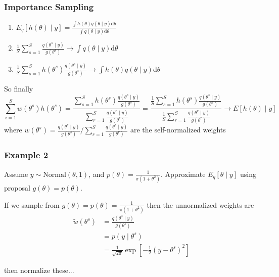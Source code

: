\documentclass{beamer}
\begin{document}
\begin{frame}[fragile]
\frametitle{Importance Sampling}

\begin{enumerate}
\item $E_q[h(\theta) \mid y] = \frac{\int h(\theta) q(\theta \mid y) \text{d}\theta }{\int q(\theta \mid y) \text{d}\theta } $
\item $\frac{1}{S}\sum_{s=1}^S \frac{q(\theta^s \mid y)}{g(\theta^s)} \to \int q(\theta \mid y) \text{d}\theta$ 
\item $\frac{1}{S}\sum_{s=1}^S h(\theta^s) \frac{q(\theta^s \mid y)}{g(\theta^s)} \to \int h(\theta)q(\theta \mid y) \text{d}\theta$
\end{enumerate}

So finally
\[
\sum_{i=1}^S w(\theta^s) h(\theta^s)
=
\frac{
\sum_{s=1}^S h(\theta^s) \frac{q(\theta^s \mid y)}{g(\theta^s)}}{
\sum_{r=1}^S \frac{q(\theta^{r} \mid y)}{g(\theta^{r})}  
}
=
\frac{
\frac{1}{S}\sum_{s=1}^S h(\theta^s) \frac{q(\theta^s \mid y)}{g(\theta^s)}}{
\frac{1}{S}\sum_{r=1}^S \frac{q(\theta^{r} \mid y)}{g(\theta^{r})}  
}
\to E[h(\theta) \mid y]
\]
where $w(\theta^s) = \frac{q(\theta^s \mid y)}{g(\theta^s)} \bigg/ \sum_{r=1}^S \frac{q(\theta^{r} \mid y)}{g(\theta^{r})}  $ are the self-normalized weights

\end{frame}


\begin{frame}[fragile]
\frametitle{Example 2}

Assume $y \sim \text{Normal}(\theta,1)$, and $p(\theta) = \frac{1}{\pi(1+\theta^2)}$. Approximate $E_q[\theta \mid y]$ using proposal $g(\theta) = p(\theta)$.
\newline
\pause

If we sample from $g(\theta) = p(\theta) = \frac{1}{\pi(1+\theta^2)}$ then the unnormalized weights are
\begin{align*}
\tilde{w}(\theta^s) &= \frac{ q(\theta^s \mid y)}{g(\theta^s)}  \\
&= p(y \mid \theta^s )  \\
&= \frac{1}{\sqrt{2\pi}} \exp\left[-\frac{1}{2} (y-\theta^s)^2 \right] 
\end{align*}
\pause

then normalize these...

\end{frame}
\end{document}
